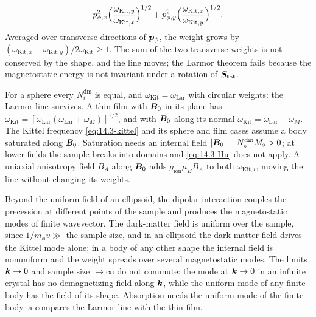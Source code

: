 \begin{equation}
  p_{\phi,x}^2\Bigl(\frac{\omega_{\mathrm{Kit},y}}{\omega_{\mathrm{Kit},x}}\Bigr)^{1/2} + p_{\phi,y}^2\Bigl(\frac{\omega_{\mathrm{Kit},x}}{\omega_{\mathrm{Kit},y}}\Bigr)^{1/2} .
  \label{eq:14.3-ellipse}
\end{equation}
Averaged over transverse directions of $\bm{p}_\phi$, the weight grows by $(\omega_{\mathrm{Kit},x} + \omega_{\mathrm{Kit},y})/2\omega_{\mathrm{Kit}} \ge 1$. The sum of the two transverse weights is not conserved by the shape, and the line moves; the Larmor theorem fails because the magnetostatic energy is not invariant under a rotation of $\bm{S}_{\mathrm{tot}}$.

For a sphere every $N^{\mathrm{dm}}_i$ is equal, and $\omega_{\mathrm{Kit}} = \omega_{\mathrm{Lar}}$ with circular weights: the Larmor line survives. A thin film with $\bm{B}_0$ in its plane has $\omega_{\mathrm{Kit}} = [\omega_{\mathrm{Lar}}(\omega_{\mathrm{Lar}} + \omega_M)]^{1/2}$, and with $\bm{B}_0$ along its normal $\omega_{\mathrm{Kit}} = \omega_{\mathrm{Lar}} - \omega_M$. The Kittel frequency \cref{eq:14.3-kittel} and its sphere and film cases assume a body saturated along $\bm{B}_0$. Saturation needs an internal field $|\bm{B}_0| - N^{\mathrm{dm}}_zM_{\mathrm{s}} > 0$; at lower fields the sample breaks into domains and \cref{eq:14.3-Hu} does not apply. A uniaxial anisotropy field $B_A$ along $\bm{B}_0$ adds $g_{\mathrm{ion}}\mu_BB_A$ to both $\omega_{\mathrm{Kit},i}$, moving the line without changing its weights.

Beyond the uniform field of an ellipsoid, the dipolar interaction couples the precession at different points of the sample and produces the magnetostatic modes of finite wavevector. The dark-matter field is uniform over the sample, since $1/m_\phi v \gg$ the sample size, and in an ellipsoid the dark-matter field drives the Kittel mode alone; in a body of any other shape the internal field is nonuniform and the weight spreads over several magnetostatic modes. The limits $\bm{k} \to 0$ and sample size $\to\infty$ do not commute: the mode at $\bm{k} \to 0$ in an infinite crystal has no demagnetizing field along $\bm{k}$, while the uniform mode of any finite body has the field of its shape. Absorption needs the uniform mode of the finite body. a compares the Larmor line with the thin film.

